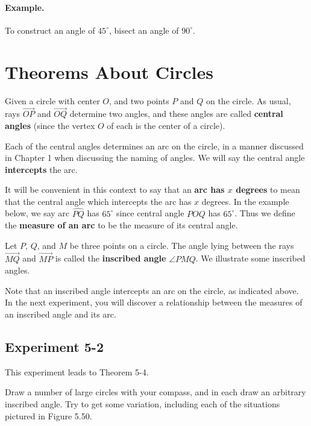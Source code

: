 \documentclass[12pt]{book} %
\begin{document}
\paragraph{Example.}
To construct an angle of $45^\circ$, bisect an angle of $90^\circ$.

\section{Theorems About Circles}

Given a circle with center $O$, and two points $P$ and $Q$ on the circle. As usual, rays $\overrightarrow{OP}$ and $\overrightarrow{OQ}$ determine two angles, and these angles are called \textbf{central angles} (since the vertex $O$ of each is the center of a circle).


Each of the central angles determines an arc on the circle, in a manner discussed in Chapter 1 when discussing the naming of angles. We will say the central angle \textbf{intercepts} the arc.

It will be convenient in this context to say that an \textbf{arc has $x$ degrees} to mean that the central angle which intercepts the arc has $x$ degrees. In the example below, we say arc $\widehat{PQ}$ has $65^\circ$ since central angle $POQ$ has $65^\circ$. Thus we define the \textbf{measure of an arc} to be the measure of its central angle.


Let $P$, $Q$, and $M$ be three points on a circle. The angle lying between the rays $\overrightarrow{MQ}$ and $\overrightarrow{MP}$ is called the \textbf{inscribed angle} $\angle PMQ$. We illustrate some inscribed angles.


Note that an inscribed angle intercepts an arc on the circle, as indicated above. In the next experiment, you will discover a relationship between the measures of an inscribed angle and its arc.

\subsection*{Experiment 5-2}

This experiment leads to Theorem 5-4.

Draw a number of large circles with your compass, and in each draw an arbitrary inscribed angle. Try to get some variation, including each of the situations pictured in Figure 5.50.
\end{document}
